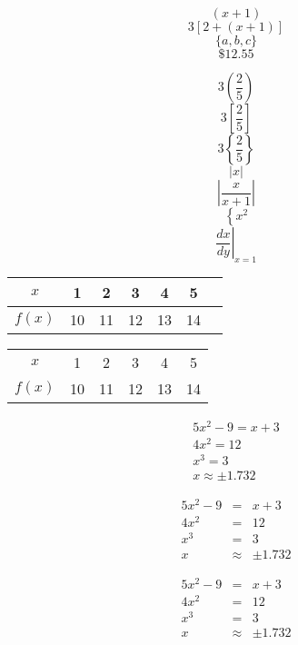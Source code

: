 \documentclass[11pt]{article}
\begin{document}
$$(x+1)$$
$$3[2+(x+1)]$$
$$\{a,b,c\}$$
$$\$12.55$$

$$3\left(\frac{2}{5}\right)$$
$$3\left[\frac{2}{5}\right]$$
$$3\left\{\frac{2}{5}\right\}$$
$$|x|$$
$$\left|\frac{x}{x+1}\right|$$
$$\left\{x^2\right.$$
$$\left.\frac{dx}{dy}\right|_{x=1}$$

\begin{tabular}{|c|c|c|c|c|c|c|}
\hline
$x$ & 1 & 2 & 3 & 4 & 5 \\ \hline
$f(x)$ & 10 & 11 & 12 & 13 & 14\\ \hline
\end{tabular}

\begin{tabular}{cccccc}

$x$ & 1 & 2 & 3 & 4 & 5 \\
$f(x)$ & 10 & 11 & 12 & 13 & 14
\end{tabular}
\begin{eqnarray}
5x^2-9= x+3 \\
4x^2=12\\
x^3=3\\
x \approx\pm1.732
\end{eqnarray}

\begin{eqnarray}
5x^2-9&=& x+3 \\
4x^2&=&12\\
x^3&=&3\\
x &\approx&\pm1.732
\end{eqnarray}

\begin{eqnarray*}
5x^2-9&=& x+3 \\
4x^2&=&12\\
x^3&=&3\\
x &\approx&\pm1.732
\end{eqnarray*}
\end{document}
